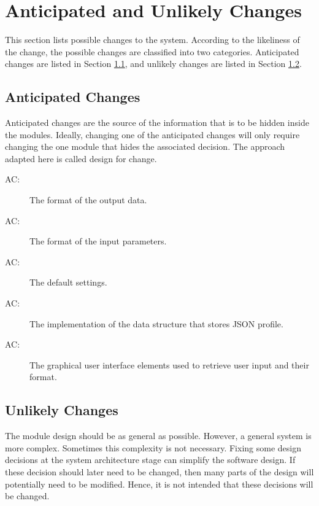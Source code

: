 \documentclass[12pt, titlepage]{article}
\newcounter{acnum}
\newcommand{\actheacnum}{AC\theacnum}
\begin{document}
\section{Anticipated and Unlikely Changes} \label{SecChange}

This section lists possible changes to the system. According to the likeliness
of the change, the possible changes are classified into two
categories. Anticipated changes are listed in Section \ref{SecAchange}, and
unlikely changes are listed in Section \ref{SecUchange}.

\subsection{Anticipated Changes} \label{SecAchange}
Anticipated changes are the source of the information that is to be hidden
inside the modules. Ideally, changing one of the anticipated changes will only
require changing the one module that hides the associated decision. The approach
adapted here is called design for
change.

\begin{description}
\item[ \actheacnum \label{acHardware}:] The format of the output data.
\item[ \actheacnum \label{acInput}:] The format of the input parameters.
\item[ \actheacnum \label{acSettings}:] The default settings.
\item[ \actheacnum \label{acData}:] The implementation of the data structure that stores JSON profile.
\item[ \actheacnum \label{acgui}:] The graphical user interface elements used to retrieve user input and their format.
\end{description}

\subsection{Unlikely Changes} \label{SecUchange}
The module design should be as general as possible. However, a general system is
more complex. Sometimes this complexity is not necessary. Fixing some design
decisions at the system architecture stage can simplify the software design. If
these decision should later need to be changed, then many parts of the design
will potentially need to be modified. Hence, it is not intended that these
decisions will be changed.
\end{document}

